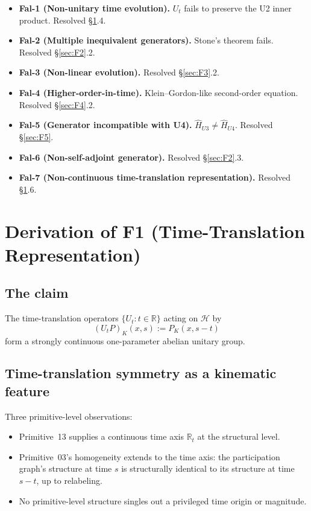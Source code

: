 \documentclass[11pt,a4paper]{article}
\begin{document}
\begin{itemize}
  \item \textbf{Fal-1 (Non-unitary time evolution).} $U_t$ fails to preserve the U2 inner product. Resolved \S\ref{sec:F1}.4.
  \item \textbf{Fal-2 (Multiple inequivalent generators).} Stone's theorem fails. Resolved \S\ref{sec:F2}.2.
  \item \textbf{Fal-3 (Non-linear evolution).} Resolved \S\ref{sec:F3}.2.
  \item \textbf{Fal-4 (Higher-order-in-time).} Klein--Gordon-like second-order equation. Resolved \S\ref{sec:F4}.2.
  \item \textbf{Fal-5 (Generator incompatible with U4).} $\hat{H}_{U3} \neq \hat{H}_{U4}$. Resolved \S\ref{sec:F5}.
  \item \textbf{Fal-6 (Non-self-adjoint generator).} Resolved \S\ref{sec:F2}.3.
  \item \textbf{Fal-7 (Non-continuous time-translation representation).} Resolved \S\ref{sec:F1}.6.
\end{itemize}

\section{Derivation of F1 (Time-Translation Representation)}\label{sec:F1}

\subsection{The claim}

The time-translation operators $\{U_t : t \in \mathbb{R}\}$ acting on $\mathcal{H}$ by
\[
(U_t P)_K(x, s) := P_K(x, s - t)
\]
form a strongly continuous one-parameter abelian unitary group.

\subsection{Time-translation symmetry as a kinematic feature}

Three primitive-level observations:

\begin{itemize}
  \item[\textbf{(i)}] Primitive~13 supplies a continuous time axis $\mathbb{R}_t$ at the structural level.
  \item[\textbf{(ii)}] Primitive~03's homogeneity extends to the time axis: the participation graph's structure at time $s$ is structurally identical to its structure at time $s - t$, up to relabeling.
  \item[\textbf{(iii)}] No primitive-level structure singles out a privileged time origin or magnitude.
\end{itemize}
\end{document}
